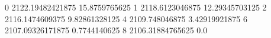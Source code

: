 0 2122.19482421875 15.8759765625
1 2118.6123046875 12.29345703125
2 2116.1474609375 9.82861328125
4 2109.748046875 3.42919921875
6 2107.09326171875 0.7744140625
8 2106.31884765625 0.0
